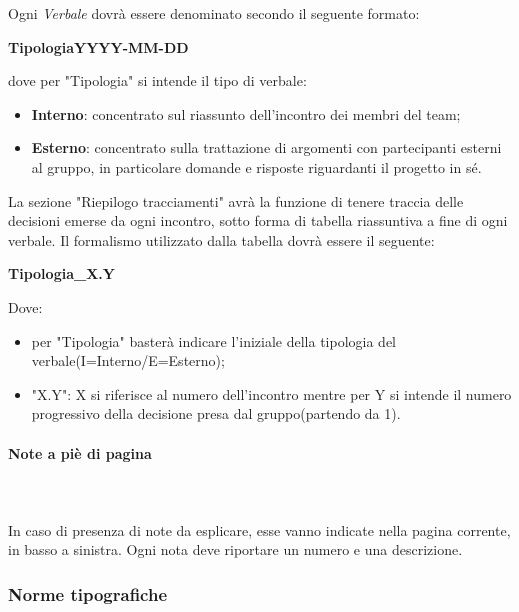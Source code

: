 		Ogni \textit{Verbale} dovrà essere denominato secondo il seguente formato: \newline \newline
		\centerline{\textbf{TipologiaYYYY-MM-DD}} \newline \newline
		dove per "Tipologia" si intende il tipo di verbale:
		\begin{itemize}
			\item \textbf{Interno}: concentrato sul riassunto dell'incontro dei membri del team;
			\item \textbf{Esterno}: concentrato sulla trattazione di argomenti con partecipanti esterni al gruppo, in particolare domande e risposte riguardanti il progetto in sé.
		\end{itemize}
		La sezione "Riepilogo tracciamenti" avrà la funzione di tenere traccia delle decisioni emerse da ogni incontro, sotto forma di tabella riassuntiva a fine di ogni verbale. Il formalismo utilizzato dalla tabella dovrà essere il seguente: \newline \newline
		\centerline{\textbf{Tipologia\_X.Y}} \newline \newline
		Dove:
		\begin{itemize}
			\item per "Tipologia" basterà indicare l'iniziale della tipologia del verbale(I=Interno/E=Esterno);
			\item "X.Y": X si riferisce al numero dell'incontro mentre per Y si intende il numero progressivo della decisione presa dal gruppo(partendo da 1).
		\end{itemize}	
		\paragraph{Note a piè di pagina} \mbox{}\\ \mbox{}\\
		In caso di presenza di note da esplicare, esse vanno indicate nella pagina corrente, in basso a sinistra. Ogni nota deve riportare un numero e una descrizione.		
	\subsubsection{Norme tipografiche}
